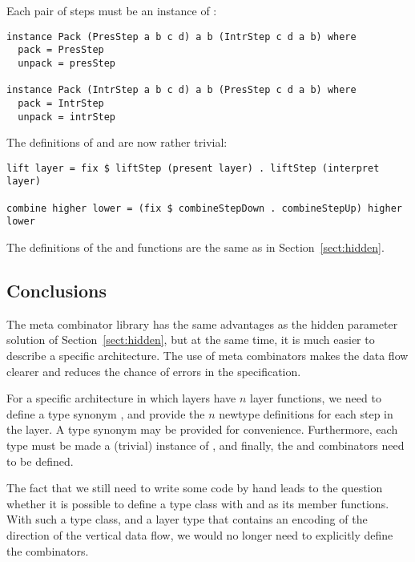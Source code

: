Each pair of steps must be an instance of : 

\begin{small}
\begin{verbatim}
instance Pack (PresStep a b c d) a b (IntrStep c d a b) where
  pack = PresStep
  unpack = presStep

instance Pack (IntrStep a b c d) a b (PresStep c d a b) where
  pack = IntrStep
  unpack = intrStep
\end{verbatim}
\end{small}

The definitions of  and  are now rather trivial:

\begin{small}
\begin{verbatim}
lift layer = fix $ liftStep (present layer) . liftStep (interpret layer)

combine higher lower = (fix $ combineStepDown . combineStepUp) higher lower
\end{verbatim}
\end{small}

The definitions of the  and  functions are the same as in Section~\ref{sect:hidden}.


\subsection{Conclusions} 

The meta combinator library has the same advantages as the hidden parameter solution of Section~\ref{sect:hidden}, but at the same time, it is much easier to describe a specific architecture. The use of meta combinators makes the data flow clearer and reduces the chance of errors in the specification.

For a specific architecture in which layers have $n$ layer functions, we need to define a type synonym , and provide the $n$ newtype definitions  for each step in the layer. A type synonym  may be provided for convenience. Furthermore, each type  must be made a (trivial) instance of , and finally, the  and  combinators need to be defined.

The fact that we still need to write some code by hand leads to the question whether it is possible to define a type class with   and  as its member functions. With such a type class, and a layer type that contains an encoding of the direction of the vertical data flow, we would no longer need to explicitly define the combinators.


